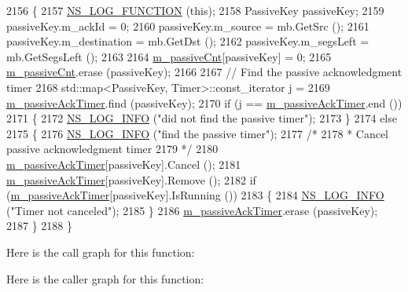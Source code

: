 \begin{DoxyCode}
2156 \{
2157   \hyperlink{log-macros-disabled_8h_a90b90d5bad1f39cb1b64923ea94c0761}{NS\_LOG\_FUNCTION} (\textcolor{keyword}{this});
2158   PassiveKey passiveKey;
2159   passiveKey.m\_ackId = 0;
2160   passiveKey.m\_source = mb.GetSrc ();
2161   passiveKey.m\_destination = mb.GetDst ();
2162   passiveKey.m\_segsLeft = mb.GetSegsLeft ();
2163 
2164   \hyperlink{classns3_1_1dsr_1_1DsrRouting_a7fec404d680459aab2b40941a950502d}{m\_passiveCnt}[passiveKey] = 0;
2165   \hyperlink{classns3_1_1dsr_1_1DsrRouting_a7fec404d680459aab2b40941a950502d}{m\_passiveCnt}.erase (passiveKey);
2166 
2167   \textcolor{comment}{// Find the passive acknowledgment timer}
2168   std::map<PassiveKey, Timer>::const\_iterator j =
2169     \hyperlink{classns3_1_1dsr_1_1DsrRouting_ac53c706898e76a7f4871a460d13edd36}{m\_passiveAckTimer}.find (passiveKey);
2170   \textcolor{keywordflow}{if} (j == \hyperlink{classns3_1_1dsr_1_1DsrRouting_ac53c706898e76a7f4871a460d13edd36}{m\_passiveAckTimer}.end ())
2171     \{
2172       \hyperlink{group__logging_gafbd73ee2cf9f26b319f49086d8e860fb}{NS\_LOG\_INFO} (\textcolor{stringliteral}{"did not find the passive timer"});
2173     \}
2174   \textcolor{keywordflow}{else}
2175     \{
2176       \hyperlink{group__logging_gafbd73ee2cf9f26b319f49086d8e860fb}{NS\_LOG\_INFO} (\textcolor{stringliteral}{"find the passive timer"});
2177       \textcolor{comment}{/*}
2178 \textcolor{comment}{       * Cancel passive acknowledgment timer}
2179 \textcolor{comment}{       */}
2180       \hyperlink{classns3_1_1dsr_1_1DsrRouting_ac53c706898e76a7f4871a460d13edd36}{m\_passiveAckTimer}[passiveKey].Cancel ();
2181       \hyperlink{classns3_1_1dsr_1_1DsrRouting_ac53c706898e76a7f4871a460d13edd36}{m\_passiveAckTimer}[passiveKey].Remove ();
2182       \textcolor{keywordflow}{if} (\hyperlink{classns3_1_1dsr_1_1DsrRouting_ac53c706898e76a7f4871a460d13edd36}{m\_passiveAckTimer}[passiveKey].IsRunning ())
2183         \{
2184           \hyperlink{group__logging_gafbd73ee2cf9f26b319f49086d8e860fb}{NS\_LOG\_INFO} (\textcolor{stringliteral}{"Timer not canceled"});
2185         \}
2186       \hyperlink{classns3_1_1dsr_1_1DsrRouting_ac53c706898e76a7f4871a460d13edd36}{m\_passiveAckTimer}.erase (passiveKey);
2187     \}
2188 \}
\end{DoxyCode}


Here is the call graph for this function\+:




Here is the caller graph for this function\+:


